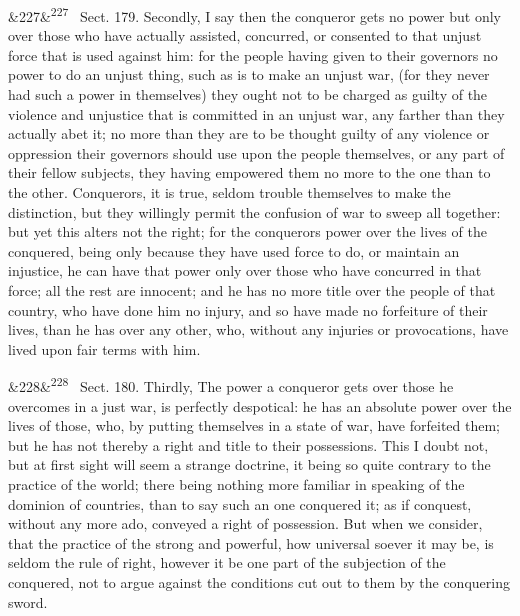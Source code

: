 \documentclass[12pt]{article}
\newcommand{\para}[1][]{\par\noindent\ifx&#1&\else\textsuperscript{\footnotesize #1}~\fi}
\begin{document}
\para[227] Sect. 179. Secondly, I say then the conqueror gets no power but only over those who have actually assisted, concurred, or consented to that unjust force that is used against him: for the people having given to their governors no power to do an unjust thing, such as is to make an unjust war, (for they never had such a power in themselves) they ought not to be charged as guilty of the violence and unjustice that is committed in an unjust war, any farther than they actually abet it; no more than they are to be thought guilty of any violence or oppression their governors should use upon the people themselves, or any part of their fellow subjects, they having empowered them no more to the one than to the other. Conquerors, it is true, seldom trouble themselves to make the distinction, but they willingly permit the confusion of war to sweep all together: but yet this alters not the right; for the conquerors power over the lives of the conquered, being only because they have used force to do, or maintain an injustice, he can have that power only over those who have concurred in that force; all the rest are innocent; and he has no more title over the people of that country, who have done him no injury, and so have made no forfeiture of their lives, than he has over any other, who, without any injuries or provocations, have lived upon fair terms with him.

\para[228] Sect. 180. Thirdly, The power a conqueror gets over those he overcomes in a just war, is perfectly despotical: he has an absolute power over the lives of those, who, by putting themselves in a state of war, have forfeited them; but he has not thereby a right and title to their possessions. This I doubt not, but at first sight will seem a strange doctrine, it being so quite contrary to the practice of the world; there being nothing more familiar in speaking of the dominion of countries, than to say such an one conquered it; as if conquest, without any more ado, conveyed a right of possession. But when we consider, that the practice of the strong and powerful, how universal soever it may be, is seldom the rule of right, however it be one part of the subjection of the conquered, not to argue against the conditions cut out to them by the conquering sword.
\end{document}
